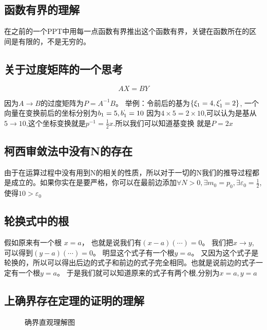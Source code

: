 \documentclass[fontset=windows]{article}
\begin{document}
   

    \subsection{函数有界的理解}

    在之前的一个PPT中用每一点函数有界推出这个函数有界，关键在函数所在的区间是有限的，不是无穷的。

    \subsection{关于过度矩阵的一个思考}

    \[AX = BY\]

    因为$A\to B$的过度矩阵为$P = A^{-1}B$。
    举例：令前后的基为$\{\xi_1 = 4, \xi_1^{`} = 2\}$, 一个向量在变换前后的坐标分别为$b_1 = 5, b_1^{`} = 10$
    因为$4\times 5 = 2\times 10$,可以认为是基从$5\to10$,这个坐标变换就是$p^{-1} = \frac{1}{2}x$.所以我们可以知道基变换
    就是$P = 2x$

    \subsection{柯西审敛法中没有N的存在}

    由于在运算过程中没有用到N的相关的性质，所以对于一切的N我们的推导过程都是成立的。如果你实在是要严格，你可以在最前边添加$\forall N> 0 ,\exists m_0 = p_0 ,\exists \varepsilon_0 = \frac{1}{2}$, 使得$10 > \varepsilon_0$



    \subsection{轮换式中的根}

    假如原来有一个根 $x =a$， 也就是说我们有$(x-a)(\cdots)= 0$。 我们把$x\to y$, 可以得到$(y-a) (\cdots )=0$。 明显这个式子有一个根$y =a$。 又因为这个式子是轮换的，所以可以得出后边的式子和前边的式子完全相同。也就是说前边的式子一定有一个根$y =a$。 于是我们就可以知道原来的式子有两个根,分别为$x = a, y=a$


    \subsection{上确界存在定理的证明的理解}
    \begin{figure}[!htb]
        \caption{确界直观理解图}
    \end{figure}
\end{document}
